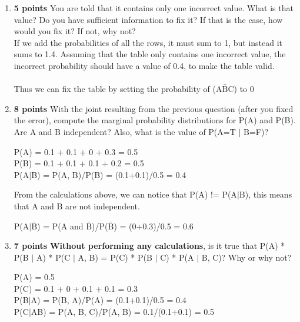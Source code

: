 \documentclass{article}
\def\ans#1{{\color{ans}#1}}
\begin{document}
\begin{enumerate}[label=(\alph*)]
    \item \textbf{5 points} You are told that it contains only one incorrect value. What is that value? Do you have sufficient information to fix it? If that is the case, how would you fix it? If not, why not? \\
    \ans{
        If we add the probabilities of all the rows, it must sum to 1, but instead it sums to 1.4. 
        Assuming that the table only contains one incorrect value, the incorrect probability should have 
        a value of 0.4, to make the table valid. \\ \\
        Thus we can fix the table by setting the probability of (A$\bar{\text{B}}$C) to 0
    } 
    \item \textbf{8 points} With the joint resulting from the previous question (after you fixed the error), compute the marginal probability distributions for P(A) and P(B). Are A and B independent? Also, what is the value of P(A=T $|$ B=F)?  \\
    \ans{
        \begin{center}
            P(A) = 0.1 + 0.1 + 0 + 0.3 = 0.5 \\
            P(B) = 0.1 + 0.1 + 0.1 + 0.2 = 0.5 \\
            P(A$|$B) = P(A, B)/P(B) = (0.1+0.1)/0.5 = 0.4 \\
        \end{center}
        From the calculations above, we can notice that P(A) != P(A$|$B), this means that A and B 
        are not independent. \\
        \begin{center}
            P(A$|$$\bar{\text{B}}$) = P(A and $\bar{\text{B}}$)/P($\bar{\text{B}}$) = (0+0.3)/0.5 = 0.6 \\
        \end{center}
    }
    \item \textbf{7 points} \textbf{Without performing any calculations}, is it true that P(A) * P(B $|$ A) * P(C $|$ A, B) = P(C) * P(B $|$ C) * P(A $|$ B, C)? Why or why not?\\
    \ans{
        \begin{center}
            P(A) = 0.5 \\
            P(C) = 0.1 + 0 + 0.1 + 0.1 = 0.3 \\
            P(B$|$A) = P(B, A)/P(A) = (0.1+0.1)/0.5 = 0.4 \\
            P(C$|$AB) = P(A, B, C)/P(A, B) = 0.1/(0.1+0.1) = 0.5 \\

\end{center}}
\end{enumerate}
\end{document}
